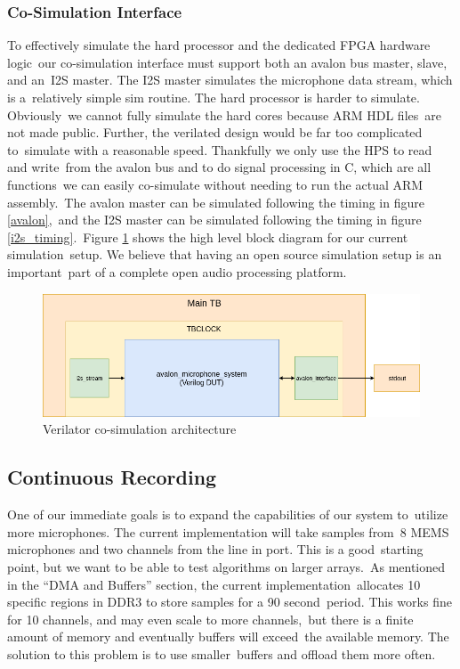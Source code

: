 \documentclass{article}
\begin{document}
\subsubsection{Co-Simulation Interface}
To effectively simulate the hard processor and the dedicated FPGA hardware logic\
our co-simulation interface must support both an avalon bus master, slave, and an\
I2S master. The I2S master simulates the microphone data stream, which is a\
relatively simple sim routine. The hard processor is harder to simulate. Obviously\
we cannot fully simulate the hard cores because ARM HDL files\
are not made public. Further, the verilated design would be far too complicated to\
simulate with a reasonable speed. Thankfully we only use the HPS to read and write\
from the avalon bus and to do signal processing in C, which are all functions\
we can easily co-simulate without needing to run the actual ARM assembly.\
The avalon master can be simulated following the timing in figure \ref{avalon},\
and the I2S master can be simulated following the timing in figure \ref{i2s_timing}.\
Figure \ref{verilator} shows the high level block diagram for our current simulation\
setup. We believe that having an open source simulation setup is an important\
part of a complete open audio processing platform.

\begin{figure}[ht]
	\begin{center}
	\includegraphics[scale=.3]{pictures/myblock.png}
	\caption{Verilator co-simulation architecture}
	\label{verilator}
	\end{center}
\end{figure}

\subsection{Continuous Recording}
One of our immediate goals is to expand the capabilities of our system to\
utilize more microphones. The current implementation will take samples from\
8 MEMS microphones and two channels from the line in port. This is a good\
starting point, but we want to be able to test algorithms on larger arrays.\
As mentioned in the ``DMA and Buffers'' section, the current implementation\
allocates 10 specific regions in DDR3 to store samples for a 90 second\
period. This works fine for 10 channels, and may even scale to more channels,\
but there is a finite amount of memory and eventually buffers will exceed\
the available memory. The solution to this problem is to use smaller\
buffers and offload them more often.
\end{document}
